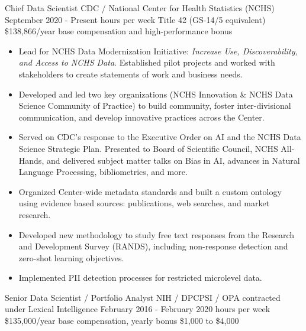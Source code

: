 \documentclass[]{scrartcl}
\begin{document}
\begin{cleanCV}


  \vspace{-1em}

    
  \WorkExperience
{}
{Chief Data Scientist}
{
  \newline CDC / National Center for Health Statistics (NCHS)
  \newline September 2020 - Present
   hours per week
  \newline Title 42 (GS-14/5 equivalent) \$138,866/year base compensation and high-performance bonus 
}
{
  \vspace{-0.25em}
  \begin{itemize}

   \item Lead for NCHS Data Modernization Initiative: \emph{Increase Use, Discoverability, and Access to NCHS Data}. Established pilot projects and worked with stakeholders to create statements of work and business needs.
   \item Developed and led two key organizations (NCHS Innovation \& NCHS Data Science Community of Practice) to build community, foster inter-divisional communication, and develop innovative practices across the Center.
   \item Served on CDC's response to the Executive Order on AI and the NCHS Data Science Strategic Plan. Presented to Board of Scientific Council, NCHS All-Hands, and delivered subject matter talks on Bias in AI, advances in Natural Language Processing, bibliometrics, and more.
   \item Organized Center-wide metadata standards and built a custom ontology using evidence based sources: publications, web searches, and market research.
   \item Developed new methodology to study free text responses from the Research and Development Survey (RANDS), including non-response detection and zero-shot learning objectives.
   \item Implemented PII detection processes for restricted microlevel data.
  \end{itemize}
}
  
  \WorkExperience
{}
{Senior Data Scientist / Portfolio Analyst}
{
  \newline NIH / DPCPSI / OPA contracted under Lexical Intelligence
  \newline February 2016 - February 2020
   hours per week
  \newline \$135,000/year base compensation, yearly bonus \$1,000 to \$4,000
}
{
  \vspace{-0.25em}
  \begin{itemize}
    

\end{itemize}}
\end{cleanCV}
\end{document}
